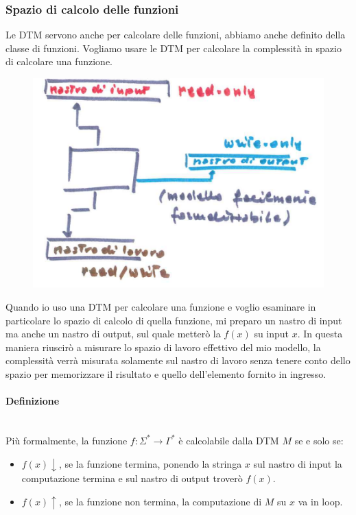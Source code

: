 \documentclass{article}
\begin{document}
\subsubsection{Spazio di calcolo delle funzioni}
Le DTM servono anche per calcolare delle funzioni, abbiamo anche definito della classe
di funzioni. Vogliamo usare le DTM per calcolare la complessità in spazio di calcolare una funzione.
\begin{figure}[H]
    \centering
    \includegraphics[scale=0.6]{images/DTM_func.png}
\end{figure}
Quando io uso una DTM per calcolare una funzione e voglio esaminare in particolare lo spazio
di calcolo di quella funzione, mi preparo un nastro di input ma anche un nastro di output, sul
quale metterò la $f(x)$ su input $x$. In questa maniera riuscirò a misurare lo spazio di lavoro
effettivo del mio modello, la complessità verrà misurata solamente sul nastro di lavoro senza
tenere conto dello spazio per memorizzare il risultato e quello dell'elemento fornito in ingresso.

\paragraph{Definizione}\mbox{}\\
Più formalmente, la funzione $f:\Sigma^*\rightarrow\Gamma^*$ è calcolabile dalla DTM $M$ se e solo se:
\begin{itemize}
    \item $f(x)\downarrow$, se la funzione termina, ponendo la stringa $x$ sul nastro di input la computazione
          termina e sul nastro di output troverò $f(x)$.
    \item $f(x)\uparrow$, se la funzione non termina, la computazione di $M$ su $x$ va in loop.
\end{itemize}
\end{document}
